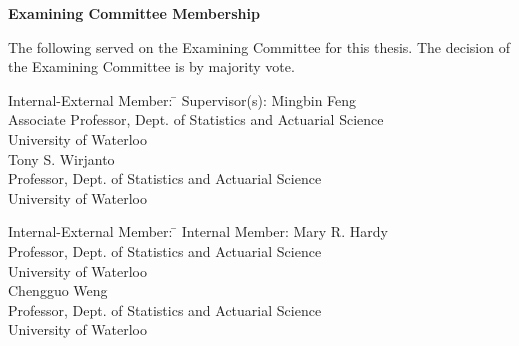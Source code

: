 \cleardoublepage %

 
\begin{center}\textbf{Examining Committee Membership}\end{center}
  \noindent
The following served on the Examining Committee for this thesis. The decision of the Examining Committee is by majority vote.
  \bigskip
  
  
  \noindent
\begin{tabbing}
Internal-External Member: \=  \kill %
Supervisor(s): \> Mingbin Feng \\
\> Associate Professor, Dept. of Statistics and Actuarial Science\\
\> University of Waterloo \\[1cm]
\> Tony S. Wirjanto \\
\> Professor, Dept. of Statistics and Actuarial Science \\
\> University of Waterloo \\
\end{tabbing}
  \bigskip
  
  \noindent
  \begin{tabbing}
Internal-External Member: \=  \kill %
Internal Member: \> Mary R. Hardy \\
\> Professor, Dept. of Statistics and Actuarial Science \\
\> University of Waterloo\\[1cm]
\> Chengguo Weng \\
\> Professor, Dept. of Statistics and Actuarial Science \\
\> University of Waterloo \\
\end{tabbing}
  \bigskip
  
